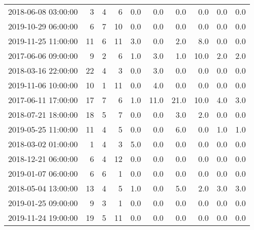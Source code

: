 \begin{table}[H]
{\begin{tabular}{lrrrrrrrrr}
2018-06-08 03:00:00 &     3 &            4 &      6 &         0.0 &         0.0 &         0.0 &         0.0 &           0.0 &           0.0 \\
2019-10-29 06:00:00 &     6 &            7 &     10 &         0.0 &         0.0 &         0.0 &         0.0 &           0.0 &           0.0 \\
2019-11-25 11:00:00 &    11 &            6 &     11 &         3.0 &         0.0 &         2.0 &         8.0 &           0.0 &           0.0 \\
2017-06-06 09:00:00 &     9 &            2 &      6 &         1.0 &         3.0 &         1.0 &        10.0 &           2.0 &           2.0 \\
2018-03-16 22:00:00 &    22 &            4 &      3 &         0.0 &         3.0 &         0.0 &         0.0 &           0.0 &           0.0 \\
2019-11-06 10:00:00 &    10 &            1 &     11 &         0.0 &         4.0 &         0.0 &         0.0 &           0.0 &           0.0 \\
2017-06-11 17:00:00 &    17 &            7 &      6 &         1.0 &        11.0 &        21.0 &        10.0 &           4.0 &           3.0 \\
2018-07-21 18:00:00 &    18 &            5 &      7 &         0.0 &         0.0 &         3.0 &         2.0 &           0.0 &           0.0 \\
2019-05-25 11:00:00 &    11 &            4 &      5 &         0.0 &         0.0 &         6.0 &         0.0 &           1.0 &           1.0 \\
2018-03-02 01:00:00 &     1 &            4 &      3 &         5.0 &         0.0 &         0.0 &         0.0 &           0.0 &           0.0 \\
2018-12-21 06:00:00 &     6 &            4 &     12 &         0.0 &         0.0 &         0.0 &         0.0 &           0.0 &           0.0 \\
2019-01-07 06:00:00 &     6 &            6 &      1 &         0.0 &         0.0 &         0.0 &         0.0 &           0.0 &           0.0 \\
2018-05-04 13:00:00 &    13 &            4 &      5 &         1.0 &         0.0 &         5.0 &         2.0 &           3.0 &           3.0 \\
2019-01-25 09:00:00 &     9 &            3 &      1 &         0.0 &         0.0 &         0.0 &         0.0 &           0.0 &           0.0 \\
2019-11-24 19:00:00 &    19 &            5 &     11 &         0.0 &         0.0 &         0.0 &         0.0 &           0.0 &           0.0 \\

\end{tabular}}
\end{table}
